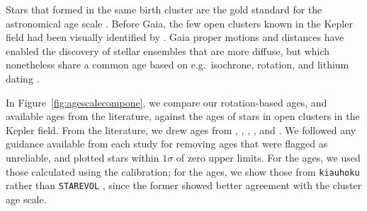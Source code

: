 \documentclass[11pt,twocolumn,tighten]{aastex63}
\begin{document}
\begin{figure*}[!t]
	\begin{center}
	\end{center}
	\vspace{-0.5cm}
	\caption{
		{\bf Literature ages vs.~benchmark open cluster ages.}
		Each point denotes a reported age,
		normalized by the age of a stellar ensemble in which the star
		is a candidate member.
		Cluster membership was assessed in previous studies without knowledge of rotation.
		Although some field interlopers may be present in the 
		membership lists,
		any outliers can be compared between different methods on a
		relative basis.
		The number of stars in any given cluster follows by crossmatching every study against
		a fixed cluster list; certain methods report ages for more stars than others.
		Horizontal scatter is artificially added to visually
		clarify the statistical age uncertainties.
	}
	\label{fig:agescalecompone}
\end{figure*}

Stars that formed in the same birth cluster are the gold standard for
the astronomical age scale \citep{Soderblom_2010}.  Before Gaia, the
few open clusters known in the Kepler field had been
visually identified by \citet{1864RSPT..154....1H}.  Gaia proper
motions and distances have enabled the discovery of stellar ensembles
that are more diffuse, but which nonetheless share a common age based
on e.g.~isochrone, rotation, and lithium dating
\cite[e.g.][]{2019AJ....158..122K,Bouma_2022b,Barber_2022}.

In Figure~\ref{fig:agescalecompone}, we compare our rotation-based
ages, and available ages from the literature, against the ages of
stars in open clusters in the Kepler field.  From the
literature, we drew ages from \citet{Reinhold_2015},
\citet{Berger_2020a_catalog}, \citet{2021AJ....161..189L},
\citet{2023ApJ...952..131M}, and \citet{2024AJ....167..159L}.  We
followed any guidance available from each study for
removing ages that were flagged as unreliable, and plotted
stars within $1\sigma$ of zero upper limits.  For the
\citeauthor{Reinhold_2015} ages, we used those calculated
using the \citet{Mamajek_2008} calibration; for the
\citeauthor{2023ApJ...952..131M} ages, we show those from
\texttt{kiauhoku} \citep{Claytor2020} rather than \texttt{STAREVOL}
\citep{Amard2019}, since the former showed better agreement with
the cluster age scale.
\end{document}
